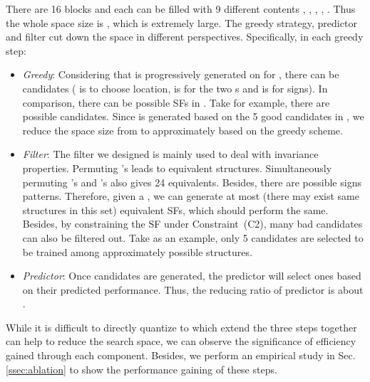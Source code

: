 \documentclass[conference]{IEEEtran}
\begin{document}
There are 16 blocks and each can be filled with 9 different contents 
, , , , .
Thus the whole space size is , which is extremely large.
The greedy strategy,
predictor
and filter
cut down the space 
in different perspectives.
Specifically,
in each greedy step:
\begin{itemize}[leftmargin=10px,itemsep = 5px]


\item \textit{Greedy}: 
Considering that  is progressively generated on  for , 
there can be  candidates
( is to choose location,  is for the two s and  is for signs).
In comparison,
there can be  possible SFs in .
Take  for example, 
there are   possible candidates.
Since  is generated based on the 5 good candidates in ,
we reduce the space size from   to approximately 
based on the greedy scheme.

\item \textit{Filter}:
The filter we designed is mainly used to deal with invariance properties.
Permuting 's leads to  equivalent structures.
Simultaneously permuting 's
and 's also gives 24 equivalents.
Besides, there are  possible signs patterns.
Therefore, given a , 
we can generate at most 
(there may exist same structures in this set) 
 equivalent SFs,
which should perform the same.
Besides, by constraining the SF 
under Constraint~(C2),
many bad candidates can also be filtered out.
Take  as an example,
only 5 candidates are selected to be trained among approximately  possible structures.


\item \textit{Predictor}:
Once  candidates are generated, 
the predictor will select  ones based on their predicted performance.
Thus, the reducing ratio of predictor is about .

\end{itemize}

While 
it is difficult to 
directly quantize
to which extend
the three steps together 
can help to reduce the search space,
we can observe the significance of efficiency gained through each component.
Besides, 
we perform an empirical study
in Sec.\ref{ssec:ablation}
to show the performance gaining of these steps.   
\end{document}
